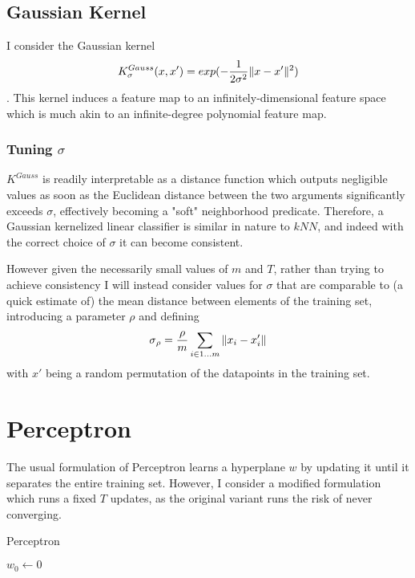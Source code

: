 \subsection{Gaussian Kernel}
I consider the Gaussian kernel \[
K^{Gauss}_\sigma{}(x, x') = {exp}(-\frac{1}{2\sigma{}^2}\Vert{} x-x' \Vert{}^2)
\]. This kernel induces a feature map to an infinitely-dimensional feature space which is much akin to an infinite-degree polynomial feature map.

\subsubsection{Tuning $\sigma{}$}

$K^{Gauss}$ is readily interpretable as a distance function which outputs negligible values as soon as the Euclidean distance between the two arguments significantly exceeds $\sigma{}$, effectively becoming a "soft" neighborhood predicate. Therefore, a Gaussian kernelized linear classifier is similar in nature to $kNN$, and indeed with the correct choice of $\sigma{}$ it can become consistent.

However given the necessarily small values of $m$ and $T$, rather than trying to achieve consistency I will instead consider values for $\sigma{}$ that are comparable to (a quick estimate of) the mean distance between elements of the training set, introducing a parameter $\rho{}$ and defining \[
\sigma{}_{\rho{}} = \frac{\rho{}}{m} \sum_{i \in 1 \dots{} m} \Vert{} x_i - x'_i \Vert{}
\] with $x'$ being a random permutation of the datapoints in the training set.

\pagebreak{}

\section{Perceptron}
The usual formulation of Perceptron learns a hyperplane $w$ by updating it until it separates the entire training set. However, I consider a modified formulation which runs a fixed $T$ updates, as the original variant runs the risk of never converging.

\begin{algorithm}[H]
    \caption{Perceptron}
    $w_0 \gets{} 0$\;
\end{algorithm}

